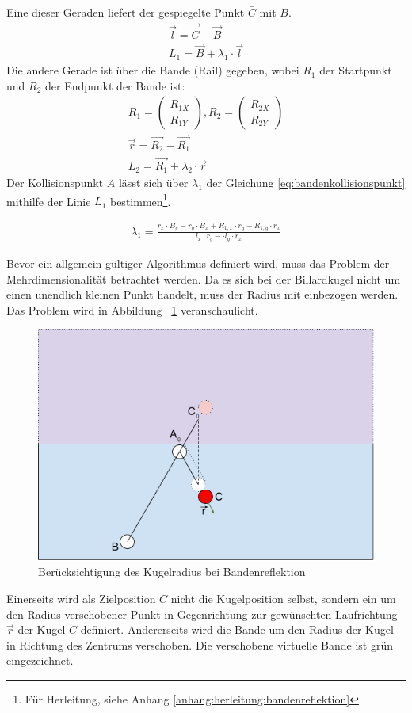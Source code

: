 Eine dieser Geraden liefert der gespiegelte Punkt $\bar{C}$ mit $B$.
\begin{align}
    \vec{l} = \vec{\bar{C}} - \vec{B}\\
    L_1 = \vec{B} + \lambda_1 \cdot \vec{l}
\end{align}
Die andere Gerade ist über die Bande (Rail) gegeben, wobei $R_1$ der Startpunkt und $R_2$ der Endpunkt der Bande ist:
\begin{align}
    R_1 = \begin{pmatrix}R_{1X}\\R_{1Y}\end{pmatrix}, R_2 = \begin{pmatrix}R_{2X}\\R_{2Y}\end{pmatrix}\\
    \vec{r} = \vec{R_2} - \vec{R_1}\\
    L_2 = \vec{R_1} + \lambda_2 \cdot \vec{r}
\end{align}
Der Kollisionspunkt $A$ lässt sich über $\lambda_1$ der Gleichung \ref{eq:bandenkollisionspunkt} mithilfe der Linie $L_1$
bestimmen\footnote{Für Herleitung, siehe Anhang \ref{anhang:herleitung:bandenreflektion}}.

\begin{align}
    \lambda_1 = \frac{r_x \cdot B_y - r_y \cdot B_x + R_{1,x} \cdot r_y - R_{1,y} \cdot r_x}{l_x \cdot r_y - \cdot l_y \cdot r_x}\label{eq:bandenkollisionspunkt}
\end{align}

Bevor ein allgemein gültiger Algorithmus definiert wird, muss das Problem der Mehrdimensionalität betrachtet werden.
Da es sich bei der Billardkugel nicht um einen unendlich kleinen Punkt handelt, muss der Radius mit einbezogen werden.
Das Problem wird in Abbildung ~\ref{fig:bandenreflektion_kugelradius} veranschaulicht.
\begin{figure}[h!]
    \begin{center}
        \includegraphics[width=0.5\linewidth]{../common/03_billiard_ai/resources/48_bandenreflektion_kugelradius.png}
    \end{center}
    \caption{Berücksichtigung des Kugelradius bei Bandenreflektion}
    \label{fig:bandenreflektion_kugelradius}
\end{figure}
Einerseits wird als Zielposition $C$ nicht die Kugelposition selbst, sondern ein um den Radius verschobener Punkt in
Gegenrichtung zur gewünschten Laufrichtung $\vec{r}$ der Kugel $C$ definiert. Andererseits wird die Bande um den Radius
der Kugel in Richtung des Zentrums verschoben. Die verschobene virtuelle Bande ist grün eingezeichnet.

